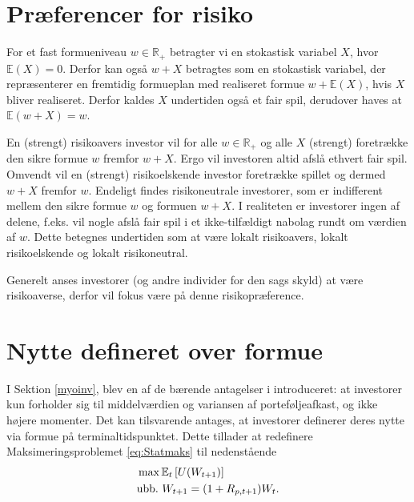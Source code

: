 \documentclass[
  a4paper,
  oneside]{memoir}
\begin{document}
\hypertarget{preforris}{%
\section{Præferencer for risiko}\label{preforris}}

For et fast formueniveau \(w\in \mathbb{R}_+\) betragter vi en stokastisk variabel \(X\), hvor \(\mathbb{E}(X)=0\). Derfor kan også \(w+X\) betragtes som en stokastisk variabel, der repræsenterer en fremtidig formueplan med realiseret formue \(w+\mathbb{E}(X)\), hvis \(X\) bliver realiseret. Derfor kaldes \(X\) undertiden også et fair spil, derudover haves at \(\mathbb{E}(w+X)=w\).

En (strengt) risikoavers investor vil for alle \(w\in \mathbb{R}_+\) og alle \(X\) (strengt) foretrække den sikre formue \(w\) fremfor \(w+X\). Ergo vil investoren altid afslå ethvert fair spil. Omvendt vil en (strengt) risikoelskende investor foretrække spillet og dermed \(w+X\) fremfor \(w\). Endeligt findes risikoneutrale investorer, som er indifferent mellem den sikre formue \(w\) og formuen \(w+X\). I realiteten er investorer ingen af delene, f.eks. vil nogle afslå fair spil i et ikke-tilfældigt nabolag rundt om værdien af \(w\). Dette betegnes undertiden som at være lokalt risikoavers, lokalt risikoelskende og lokalt risikoneutral.

Generelt anses investorer (og andre individer for den sags skyld) at være risikoaverse, derfor vil fokus være på denne risikopræference.

\hypertarget{nytdefover}{%
\section{Nytte defineret over formue}\label{nytdefover}}

I Sektion \ref{myoinv}, blev en af de bærende antagelser i \citep{Markowitz1952} introduceret: at investorer kun forholder sig til middelværdien og variansen af porteføljeafkast, og ikke højere momenter. Det kan tilsvarende antages, at investorer definerer deres nytte via formue på terminaltidspunktet. Dette tillader at redefinere Maksimeringsproblemet \eqref{eq:Statmaks} til nedenstående
\begin{align}
&\max\mathbb {E}_t\left[U(W_{t+1})\right] \label{eq:Nyttemaks}\\
&\text{ubb.}\,\,W_{t+1}=(1+R_{p,t+1})W_t.\notag
\end{align}
\end{document}
